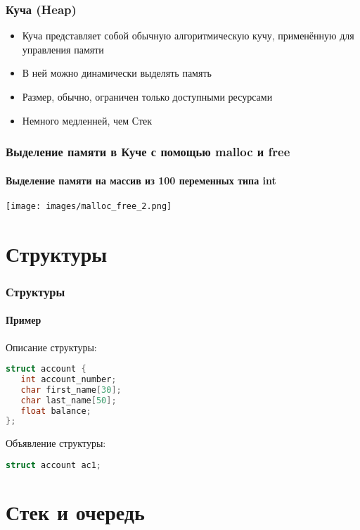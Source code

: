 \documentclass[12pt,pdf,hyperref={unicode}]{beamer}
\begin{document}
\begin{frame}[fragile]
\frametitle{Куча (Heap)} 
\begin{itemize}
\item Куча представляет собой обычную алгоритмическую кучу, применённую для управления памяти
\item В ней можно динамически выделять память
\item Размер, обычно, ограничен только доступными ресурсами
\item Немного медленней, чем Стек
\end{itemize}
\end{frame}


\begin{frame}[fragile]
\frametitle{Выделение памяти в Куче с помощью malloc и free} 
\framesubtitle{Выделение памяти на массив из 100 переменных типа int} 
\begin{center}
\texttt{[image: images/malloc\_free\_2.png]}
\end{center}
\end{frame}







\section{Структуры}



\begin{frame}[fragile]
\frametitle{Структуры} 
\framesubtitle{Пример} 
Описание структуры:
\begin{lstlisting}[language=C++,basicstyle=\ttfamily,keywordstyle=\color{blue}]
struct account {
   int account_number;
   char first_name[30];
   char last_name[50];
   float balance;
};
\end{lstlisting}
Объявление структуры:
\begin{lstlisting}[language=C++,basicstyle=\ttfamily,keywordstyle=\color{blue}]
struct account ac1;
\end{lstlisting}
\end{frame}





\section{Стек и очередь}
\end{document}
